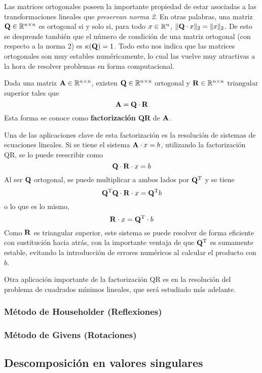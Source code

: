 Las matrices ortogonales poseen la importante propiedad de estar asociadas a las
transformaciones lineales que \emph{preservan norma 2}. En otras palabras, una
matriz $\mathbf{Q} \in \mathbb{R}^{n \times n}$ es ortogonal si y solo si, para todo
$x \in \mathbb{R}^n$, $\lVert \mathbf{Q} \cdot x \rVert_2 = \lVert x \rVert_2$.
De esto se desprende también que el número de condición de una matriz
ortogonal (con respecto a la norma 2) es $\kappa(\mathbf{Q}) = 1$. Todo esto nos
indica que las matrices ortogonales son muy estables numéricamente, lo cual
las vuelve muy atractivas a la hora de resolver problemas en forma
computacional.

Dada una matriz $\mathbf{A} \in \mathbb{R}^{n \times n}$, existen $\mathbf{Q} \in
\mathbb{R}^{n \times n}$ ortogonal y $\mathbf{R} \in \mathbb{R}^{n \times n}$ triangular
superior tales que
\[ \mathbf{A} = \mathbf{Q} \cdot \mathbf{R} \]
Esta forma se conoce como \textbf{factorización QR} de $\mathbf{A}$.

Una de las aplicaciones clave de esta factorización es la resolución
de sistemas de ecuaciones lineales. Si se tiene el sistema $\mathbf{A} \cdot x =
b$, utilizando la factorización QR, se lo puede reescribir como
\[\mathbf{Q} \cdot \mathbf{R} \cdot x = b\]
Al ser $\mathbf{Q}$ ortogonal, se puede multiplicar
a ambos lados por $\mathbf{Q}^{\mathrm{T}}$ y se tiene
\[\mathbf{Q}^{\mathrm{T}} \mathbf{Q} \cdot \mathbf{R} \cdot x = \mathbf{Q}^{\mathrm{T}} b\]
o lo que es lo mismo,
\[\mathbf{R} \cdot x = \mathbf{Q}^{\mathrm{T}} \cdot b\]
Como $\mathbf{R}$ es triangular superior, este sistema se puede resolver de forma
eficiente con sustitución hacia atrás, con la importante ventaja de que
$\mathbf{Q}^{\mathrm{T}}$ es sumamente estable, evitando la introducción de errores
numéricos al calcular el producto con $b$.

Otra aplicación importante de la factorización QR es en la resolución del
problema de cuadrados mínimos lineales, que será estudiado más adelante.

\subsubsection{Método de Householder (Reflexiones)}
\subsubsection{Método de Givens (Rotaciones)}
\subsection{Descomposición en valores singulares}

